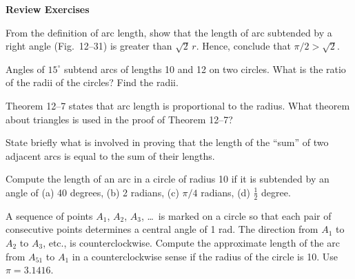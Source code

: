 \documentclass[11pt]{book}
\begin{document}
\begin{exercisecols}
\par\medskip
\begin{center}\bfseries Review Exercises\end{center}
\nopagebreak
\begin{exlist}
\item From the definition of arc length, show that the length of arc subtended
      by a right angle (Fig.~12--31) is greater than $\sqrt{2}\,r$. Hence,
      conclude that $\pi/2 > \sqrt{2}$.
\exfig{\FIGXIITHIRTYONE}
\item Angles of $15^\circ$ subtend arcs of lengths 10 and 12 on two circles.
      What is the ratio of the radii of the circles? Find the radii.
\item Theorem 12--7 states that arc length is proportional to the radius. What
      theorem about triangles is used in the proof of Theorem 12--7?
\item State briefly what is involved in proving that the length of the ``sum''
      of two adjacent arcs is equal to the sum of their lengths.
\item Compute the length of an arc in a circle of radius 10 if it is subtended
      by an angle of (a) 40 degrees, (b) 2 radians, (c) $\pi/4$ radians,
      (d) $\frac{1}{2}$ degree.
\item[\stex 6.] A sequence of points $A_1$, $A_2$, $A_3$, \ldots\ is marked on a
      circle so that each pair of consecutive points determines a central angle
      of 1 rad. The direction from $A_1$ to $A_2$ to $A_3$, etc., is
      counterclockwise. Compute the approximate length of the arc from $A_{51}$
      to $A_1$ in a counterclockwise sense if the radius of the circle is 10.
      Use $\pi = 3.1416$.
\end{exlist}
\end{exercisecols}
\end{document}
